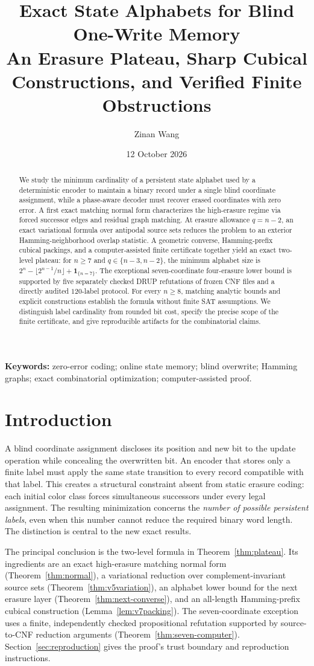 \documentclass[11pt,a4paper]{article}
\title{\textbf{Exact State Alphabets for Blind One-Write Memory}\\[4pt]\large An Erasure Plateau, Sharp Cubical Constructions, and Verified Finite Obstructions}
\author{Zinan Wang}
\date{12 October 2026}
\begin{document}
\maketitle
\begin{abstract}
We study the minimum cardinality of a persistent state alphabet used by a deterministic encoder to maintain a binary record under a single blind coordinate assignment, while a phase-aware decoder must recover erased coordinates with zero error. A first exact matching normal form characterizes the high-erasure regime via forced successor edges and residual graph matching. At erasure allowance $q=n-2$, an exact variational formula over antipodal source sets reduces the problem to an exterior Hamming-neighborhood overlap statistic. A geometric converse, Hamming-prefix cubical packings, and a computer-assisted finite certificate together yield an exact two-level plateau: for $n\ge7$ and $q\in\{n-3,n-2\}$, the minimum alphabet size is $2^n-\lfloor2^{n-1}/n\rfloor+\mathbf1_{\{n=7\}}$. The exceptional seven-coordinate four-erasure lower bound is supported by five separately checked DRUP refutations of frozen CNF files and a directly audited $120$-label protocol. For every $n\ge8$, matching analytic bounds and explicit constructions establish the formula without finite SAT assumptions. We distinguish label cardinality from rounded bit cost, specify the precise scope of the finite certificate, and give reproducible artifacts for the combinatorial claims.
\end{abstract}
\noindent\textbf{Keywords:} zero-error coding; online state memory; blind overwrite; Hamming graphs; exact combinatorial optimization; computer-assisted proof.
\section{Introduction}
A blind coordinate assignment discloses its position and new bit to the update operation while concealing the overwritten bit. An encoder that stores only a finite label must apply the same state transition to every record compatible with that label. This creates a structural constraint absent from static erasure coding: each initial color class forces simultaneous successors under every legal assignment. The resulting minimization concerns the \emph{number of possible persistent labels}, even when this number cannot reduce the required binary word length. The distinction is central to the new exact results.

The principal conclusion is the two-level formula in Theorem~\ref{thm:plateau}. Its ingredients are an exact high-erasure matching normal form (Theorem~\ref{thm:normal}), a variational reduction over complement-invariant source sets (Theorem~\ref{thm:v5variation}), an alphabet lower bound for the next erasure layer (Theorem~\ref{thm:next-converse}), and an all-length Hamming-prefix cubical construction (Lemma~\ref{lem:v7packing}). The seven-coordinate exception uses a finite, independently checked propositional refutation supported by source-to-CNF reduction arguments (Theorem~\ref{thm:seven-computer}). Section~\ref{sec:reproduction} gives the proof's trust boundary and reproduction instructions.
\end{document}
